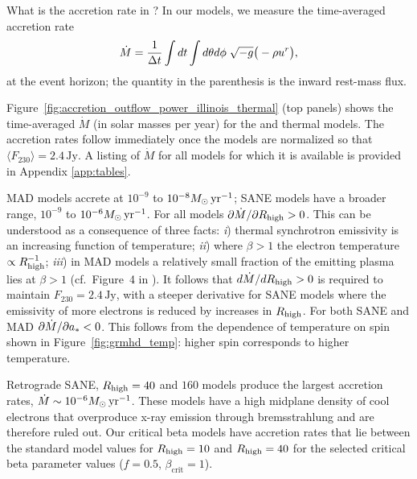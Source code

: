 
What is the accretion rate in \sgra?  In our models, we measure the time-averaged accretion rate
\begin{equation}
  \dot{M} = \frac{1}{\Delta t}\int dt\int d\theta d\phi\hspace{0.1cm}\sqrt{-g}\big(-\rho u^{r}\big),
\end{equation}
at the event horizon; the quantity in the parenthesis is the inward rest-mass flux.

Figure~\ref{fig:accretion_outflow_power_illinois_thermal} (top panels) shows the time-averaged $\dot{M}$ (in solar masses per year) for the \kharma and \bhac thermal models.  The accretion rates follow immediately once the models are normalized so that $\langle F_{230}\rangle = 2.4\,\mathrm{Jy}$.  A listing of $\dot{M}$ for all models for which it is available is provided in Appendix \ref{app:tables}.

MAD models accrete at $10^{-9}$ to $10^{-8} M_{\odot}\,\mathrm{yr}^{-1}$; SANE models have a broader range, $10^{-9}$ to $10^{-6} M_{\odot}\,\mathrm{yr}^{-1}$.  For all models $\partial\dot{M}/\partial R_\mathrm{high} > 0$.  This can be understood as a consequence of three facts: \emph{i}) thermal synchrotron emissivity is an increasing function of temperature; \emph{ii}) where $\beta > 1$ the electron temperature $\propto R_\mathrm{high}^{-1}$; \emph{iii}) in MAD models a relatively small fraction of the emitting plasma lies at $\beta > 1$ (cf.~Figure~4 in ).  It follows that $d\dot{M}/dR_\mathrm{high} > 0$ is required to maintain $F_{230} = 2.4\,\mathrm{Jy}$, with a steeper derivative for SANE models where the emissivity of more electrons is reduced by increases in $R_\mathrm{high}$.  For both SANE and MAD $\partial\dot{M}/\partial a_* < 0$.  This follows from the dependence of temperature on spin shown in Figure~\ref{fig:grmhd_temp}: higher spin corresponds to higher temperature.

Retrograde SANE, $R_\mathrm{high}=40$ and $160$ models produce the largest accretion rates, $\dot{M} \sim 10^{-6}M_{\odot}\,\mathrm{yr}^{-1}$.  These models have a high midplane density of cool electrons that overproduce x-ray emission through bremsstrahlung and are therefore ruled out.   Our critical beta models have accretion rates that lie between the standard model values for $R_\mathrm{high} = 10$ and $R_\mathrm{high} = 40$ for the selected critical beta parameter values ($f=0.5$, $\beta_\mathrm{crit}=1$).

